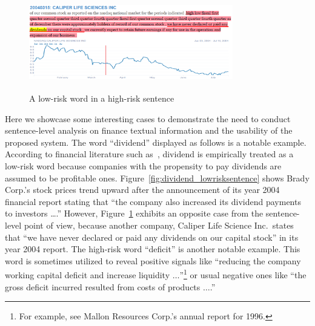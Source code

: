 \documentclass[10pt,conference,letterpaper]{IEEEtran}
\begin{document}
\begin{figure}[tbh]
\includegraphics[height=1.65in, width=3.5in]{fig/dividend_negative.png}
\caption{A low-risk word
in a high-risk sentence}\label{fig:dividend_highrisksentence}
\end{figure}
    Here we showcase some interesting cases to demonstrate the need to conduct sentence-level analysis on finance textual information and the usability of the proposed system.
    The word ``dividend'' displayed as follows is a notable example.
    According to financial literature such as~\cite{denis2008firms}, dividend is empirically treated as a low-risk word because companies with the propensity to pay dividends are assumed to be profitable ones.
    Figure~\ref{fig:dividend_lowrisksentence} shows Brady Corp.'s stock prices trend upward after the announcement of its year 2004 financial report stating that
    ``the company also increased its dividend payments to investors \ldots.'' However, Figure~\ref{fig:dividend_highrisksentence} exhibits an opposite case from the sentence-level point of view,
    because another company, Caliper Life Science Inc.\ states that ``we have never declared or paid any dividends on our capital stock'' in its year 2004 report.
    The high-risk word ``deficit'' is another notable example.
    This word is sometimes utilized to reveal positive signals like ``reducing the company working capital deficit and increase liquidity $\ldots$''\footnote{For example, see Mallon Resources Corp.'s annual report for 1996.}
    or usual negative ones like ``the gross deficit incurred resulted from costs of products $\ldots$.''
\end{document}
